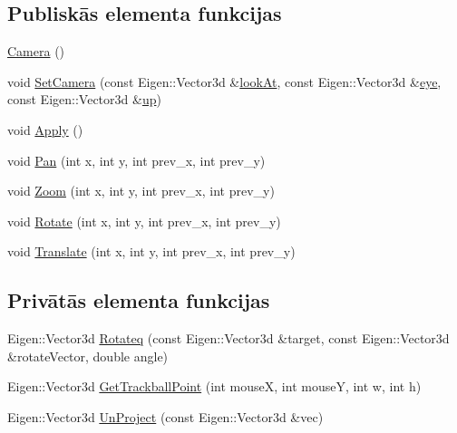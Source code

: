 \subsection*{Publiskās elementa funkcijas}
\begin{DoxyCompactItemize}
\item 
\hyperlink{class_v_p_c_1_1_g_u_i_1_1_camera_ae699f409e3205018175f7bd8b3eab657}{Camera} ()
\item 
void \hyperlink{class_v_p_c_1_1_g_u_i_1_1_camera_a5e28472053c4188219683939cad01f1f}{Set\+Camera} (const Eigen\+::\+Vector3d \&\hyperlink{class_v_p_c_1_1_g_u_i_1_1_camera_a41fa78ce129c9f56edc54f0cf7c8d60a}{look\+At}, const Eigen\+::\+Vector3d \&\hyperlink{class_v_p_c_1_1_g_u_i_1_1_camera_aa8d4d1fb2e40a19c1a18bcf04728e64a}{eye}, const Eigen\+::\+Vector3d \&\hyperlink{class_v_p_c_1_1_g_u_i_1_1_camera_a92bf7bde4d049ff9b23a304aa562e698}{up})
\item 
void \hyperlink{class_v_p_c_1_1_g_u_i_1_1_camera_a30bd1c97b4736674333192813ca9a8e1}{Apply} ()
\item 
void \hyperlink{class_v_p_c_1_1_g_u_i_1_1_camera_a04f129748aac202d1d3d9ea5f55af125}{Pan} (int x, int y, int prev\+\_\+x, int prev\+\_\+y)
\item 
void \hyperlink{class_v_p_c_1_1_g_u_i_1_1_camera_abdde0bfa7ddf8fbd1e7f04f8865797cd}{Zoom} (int x, int y, int prev\+\_\+x, int prev\+\_\+y)
\item 
void \hyperlink{class_v_p_c_1_1_g_u_i_1_1_camera_a9f41d355bea421e7403de20db33ed069}{Rotate} (int x, int y, int prev\+\_\+x, int prev\+\_\+y)
\item 
void \hyperlink{class_v_p_c_1_1_g_u_i_1_1_camera_ae2bdc4748463c831a9bc2170d0b420b1}{Translate} (int x, int y, int prev\+\_\+x, int prev\+\_\+y)
\end{DoxyCompactItemize}
\subsection*{Privātās elementa funkcijas}
\begin{DoxyCompactItemize}
\item 
Eigen\+::\+Vector3d \hyperlink{class_v_p_c_1_1_g_u_i_1_1_camera_a3bca13fbbe8272562b7261037e991860}{Rotateq} (const Eigen\+::\+Vector3d \&target, const Eigen\+::\+Vector3d \&rotate\+Vector, double angle)
\item 
Eigen\+::\+Vector3d \hyperlink{class_v_p_c_1_1_g_u_i_1_1_camera_acf91e9c32fceb9143c7dd41d45ccafca}{Get\+Trackball\+Point} (int mouseX, int mouseY, int w, int h)
\item 
Eigen\+::\+Vector3d \hyperlink{class_v_p_c_1_1_g_u_i_1_1_camera_af5f9325fafe1d0015c785d077f5c5319}{Un\+Project} (const Eigen\+::\+Vector3d \&vec)
\end{DoxyCompactItemize}
